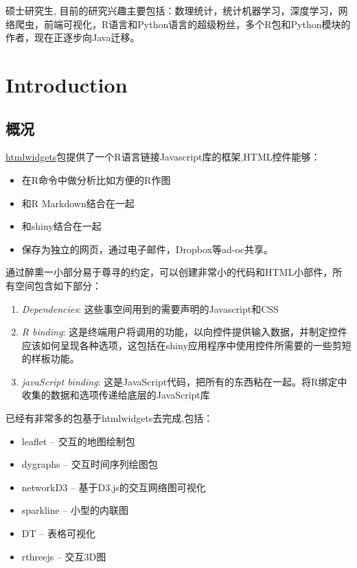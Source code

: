\documentclass[]{book}
\theoremstyle{definition}
\theoremstyle{definition}
\theoremstyle{definition}
\theoremstyle{remark}
\begin{document}
硕士研究生,
目前的研究兴趣主要包括：数理统计，统计机器学习，深度学习，网络爬虫，前端可视化，R语言和Python语言的超级粉丝，多个R包和Python模块的作者，现在正逐步向Java迁移。

\chapter{Introduction}\label{htmlwidgetsux7b80ux4ecb}

\section{概况}

\href{https://cran.r-project.org/web/packages/htmlwidgets/index.html}{htmlwidgets}包提供了一个R语言链接Javascript库的框架,HTML控件能够：

\begin{itemize}
\item
  在R命令中做分析比如方便的R作图
\item
  和R Markdown结合在一起
\item
  和shiny结合在一起
\item
  保存为独立的网页，通过电子邮件，Dropbox等ad-oc共享。
\end{itemize}

通过醉熏一小部分易于尊寻的约定，可以创建非常小的代码和HTML小部件，所有空间包含如下部分：

\begin{enumerate}
\def\labelenumi{\arabic{enumi}.}
\item
  \emph{Dependencies}: 这些事空间用到的需要声明的Javascript和CSS
\item
  \emph{R binding}:
  这是终端用户将调用的功能，以向控件提供输入数据，并制定控件应该如何呈现各种选项，这包括在shiny应用程序中使用控件所需要的一些剪短的样板功能。
\item
  \emph{javaScript binding}:
  这是JavaScript代码，把所有的东西粘在一起。将R绑定中收集的数据和选项传递给底层的JavaScript库
\end{enumerate}

已经有非常多的包基于htmlwidgets去完成,包括：

\begin{itemize}
\item
  leaflet -- 交互的地图绘制包
\item
  dygraphs -- 交互时间序列绘图包
\item
  networkD3 -- 基于D3.js的交互网络图可视化
\item
  sparkline -- 小型的内联图
\item
  DT -- 表格可视化
\item
  rthreejs -- 交互3D图
\end{itemize}
\end{document}
